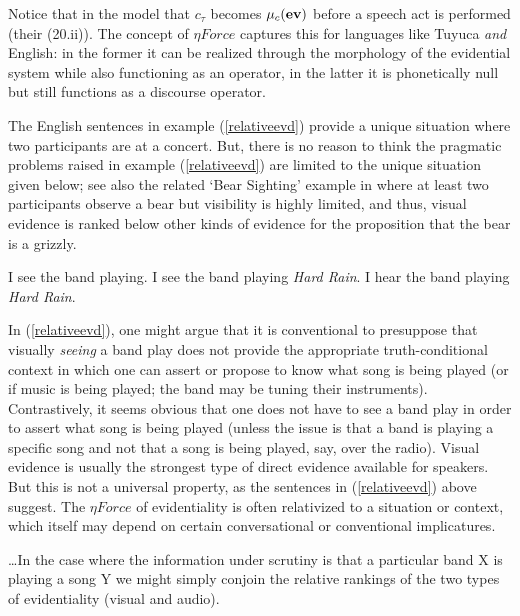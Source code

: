 \documentclass{article}
\begin{document}
Notice that in the  model that $c_{\tau}$ becomes $\mu_{c}{\bf (ev)}$ before a speech act is performed (their (20.ii)). The concept of $\eta Force$ captures this for languages like Tuyuca {\sl and} English: in the former it can be realized through the morphology of the evidential system while also functioning as an operator, in the latter it is phonetically null but still functions as a discourse operator.
 
The English sentences in example (\ref{relativeevd}) provide a unique situation where two participants are at a concert. But, there is no reason to think the pragmatic problems raised in example (\ref{relativeevd}) are limited to the unique situation given below; see also the related `Bear Sighting' example in  where at least two participants observe a bear but visibility is highly limited, and thus, visual evidence is ranked below other kinds of evidence for the proposition that the bear is a grizzly.

\begin{exe}
\ex \label{relativeevd}
\begin{xlist}
\ex I see the band playing.
\ex I see the band playing {\sl Hard Rain}.
\ex I hear the band playing {\sl Hard Rain}.
\end{xlist} 
\end{exe}

In (\ref{relativeevd}), one might argue that it is conventional to presuppose that visually {\sl seeing} a band play does not provide the appropriate truth-conditional context in which one can assert or propose to know what song is being played (or if music is being played; the band may be tuning their instruments). Contrastively, it seems obvious that one does not have to see a band play in order to assert what song is being played (unless the issue is that a band is playing a specific song and not that a song is being played, say, over the radio). Visual evidence is usually the strongest type of direct evidence available for speakers. But this is not a universal property, as the sentences in (\ref{relativeevd}) above suggest. The $\eta Force$ of evidentiality is often relativized to a situation or context, which itself may depend on certain conversational or conventional implicatures.  

\ldots In the case where the information under scrutiny is that a particular band X is playing a song Y we might simply conjoin the relative rankings of the two types of evidentiality (visual and audio).
\end{document}

